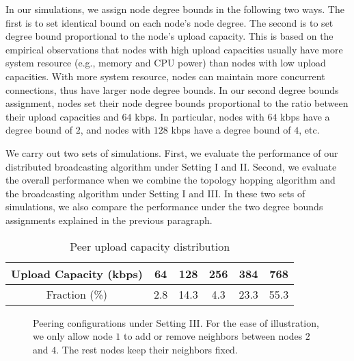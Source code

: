 \documentclass[10pt,conference]{IEEEtran}
\begin{document}
In our simulations, we assign node degree bounds in the following two ways. The first is to set identical bound on each node's node degree. The second is to set degree bound proportional to the node's upload capacity. This is based on the empirical observations that nodes with high upload capacities usually have more system resource (e.g., memory and CPU power) than nodes with low upload capacities. With more system resource, nodes can maintain more concurrent connections, thus have larger node degree bounds. In our second degree bounds assignment, nodes set their node degree bounds proportional to the ratio between their upload capacities and $64$ kbps. In particular, nodes with $64$ kbps have a degree bound of $2$, and nodes with $128$ kbps have a degree bound of $4$, etc.

We carry out two sets of simulations. First, we evaluate the performance of our distributed broadcasting algorithm under Setting I and II. Second, we evaluate the overall performance when we combine the topology hopping algorithm and the broadcasting algorithm under Setting I and III. In these two sets of simulations, we also compare the performance under the two degree bounds assignments explained in the previous paragraph.

\begin{table}
\caption{Peer upload capacity distribution}


\label{tab:distrib}

\centering{}\begin{tabular}{|c|c|c|c|c|c|}
\hline
Upload Capacity (kbps)  & 64  & 128  & 256  & 384  & 768 \tabularnewline
\hline
Fraction (\%)  & 2.8  & 14.3  & 4.3  & 23.3  & 55.3 \tabularnewline
\hline
\end{tabular}
\end{table}

\begin{figure}[hbt!]
\centering
{}
\caption{Peering configurations under Setting III. For the ease of illustration, we only allow node $1$ to add or remove neighbors between nodes $2$ and $4$. The rest nodes keep their neighbors fixed.}
\label{fig:4_config}
\end{figure}
\end{document}
